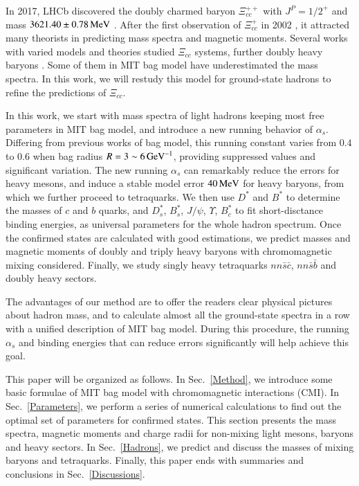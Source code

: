 \documentclass[prd,twocolumn,floatfix,nofootinbib]{revtex4}
\begin{document}
In 2017, LHCb discovered the doubly charmed baryon $\Xi_{cc}^{++}$ with $J^{P}={1/2}^{+}$ and mass $3621.40\pm 0.78\,{\rm MeV}$ \cite{Aaij:2017ueg}.
After the first observation of $\Xi_{cc}^{+}$ in 2002 \cite{Moinester:2002uw}, it attracted many theorists in predicting mass spectra and magnetic moments.
Several works with varied models and theories studied $\Xi_{cc}$ systems, further doubly heavy baryons \cite{Fleck:1989mb,Ebert:2004ck,Bernotas:2012nz,He:2004px,Karliner:2014gca,Liu:2018euh}.
Some of them in MIT bag model have underestimated the mass spectra. In this work, we will restudy this model for ground-state hadrons to refine the predictions of $\Xi_{cc}$.

In this work, we start with mass spectra of light hadrons keeping most free parameters in MIT bag model, and introduce a new running behavior of $\alpha_{s}$.
Differing from previous works of bag model, this running constant varies from $0.4$ to $0.6$ when bag radius $R=3\sim 6\,{\rm {GeV}^{-1}}$, providing suppressed values and significant variation.
The new running $\alpha_{s}$ can remarkably reduce the errors for heavy mesons, and induce a stable model error $40\,{\rm MeV}$ for heavy baryons, from which we further proceed to tetraquarks.
We then use $D^{\ast}$ and $B^{\ast}$ to determine the masses of $c$ and $b$ quarks, and $D_{s}^{\ast}$, $B_{s}^{\ast}$, $J/\psi$, $\Upsilon$, $B_{c}^{\ast}$ to fit short-disctance binding energies, as universal parameters for the whole hadron spectrum.
Once the confirmed states are calculated with good estimations, we predict masses and magnetic moments of doubly and triply heavy baryons with chromomagnetic mixing considered.
Finally, we study singly heavy tetraquarks $nn\bar{s}\bar{c}$, $nn\bar{s}\bar{b}$ and doubly heavy sectors.

The advantages of our method are to offer the readers clear physical pictures about hadron mass, and to calculate almost all the ground-state spectra in a row with a unified description of MIT bag model.
During this procedure, the running $\alpha_{s}$ and binding energies that can reduce errors significantly will help achieve this goal.

This paper will be organized as follows. In Sec.~\ref{Method}, we introduce some basic formulae of MIT bag model with chromomagnetic interactions (CMI). 
In Sec.~\ref{Parameters}, we perform a series of numerical calculations to find out the optimal set of parameters for confirmed states. 
This section presents the mass spectra, magnetic moments and charge radii for non-mixing light mesons, baryons and heavy sectors. 
In Sec.~\ref{Hadrons}, we predict and discuss the masses of mixing baryons and tetraquarks. 
Finally, this paper ends with summaries and conclusions in Sec.~\ref{Discussions}.
\end{document}
